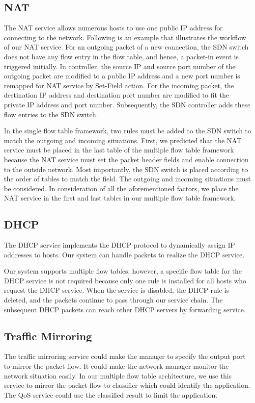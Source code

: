 \documentclass[conference]{IEEEtran}
\begin{document}
\subsection{NAT}
The NAT service allows numerous hosts to use one public IP address for connecting to the network.
Following is an example that illustrates the workflow of our NAT service.
For an outgoing packet of a new connection, the SDN switch does not have any flow entry in the flow table, and hence, a packet-in event is triggered initially.
In controller, the source IP and source port number of the outgoing packet are modified to a public IP address and a new port number is remapped for NAT service by Set-Field action.
For the incoming packet, the destination IP address and destination port number are modified to fit the private IP address and port number.
Subsequently, the SDN controller adds these flow entries to the SDN switch.

In the single flow table framework, two rules must be added to the SDN switch to match the outgoing and incoming situations.
First, we predicted that the NAT service must be placed in the last table of the multiple flow table framework because the NAT service must set the packet header fields and enable connection to the outside network.
Most importantly, the SDN switch is placed according to the order of tables to match the field.
The outgoing and incoming situations must be considered.
In consideration of all the aforementioned factors, we place the NAT service in the first and last tables in our multiple flow table framework.



\subsection{DHCP}
The DHCP service implements the DHCP protocol to dynamically assign IP addresses to hosts.
Our system can handle packets to realize the DHCP service.


Our system supports multiple flow tables; however, a specific flow table for the DHCP service is not required because only one rule is installed for all hosts who request the DHCP service.
When the service is disabled, the DHCP rule is deleted, and the packets continue to pass through our service chain.
The subsequent DHCP packets can reach other DHCP servers by forwarding service.



\subsection{Traffic Mirroring} \label{ssec:mirror}
The traffic mirroring service could make the manager to specify the output port to mirror the packet flow.
It could make the network manager monitor the network situation easily.
In our multiple flow table architecture, we use this service to mirror the packet flow to classifier which could identify the application.
The QoS service could use the classified result to limit the application.
\end{document}
